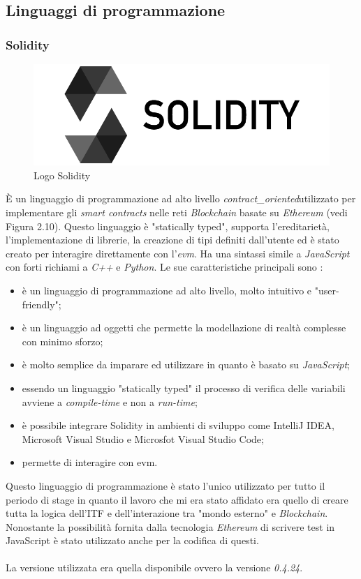 \subsection{Linguaggi di programmazione}
\subsubsection{Solidity}
\begin{figure}[h]
	\centering
	\includegraphics[scale=0.25]{immagini/solidity}
	\caption{Logo Solidity}
\end{figure}
È un linguaggio di programmazione ad alto livello \emph{\gls{contract_oriented}}\glsfirstoccur  utilizzato per implementare gli \textit{smart contracts} nelle reti \textit{Blockchain} basate su \textit{Ethereum} (vedi Figura 2.10).
Questo linguaggio è "statically typed", supporta l'ereditarietà, l'implementazione di librerie, la creazione di tipi definiti dall'utente ed è stato creato per interagire direttamente con l'\emph{\gls{evm}}\glsfirstoccur. 
Ha una sintassi simile a \textit{JavaScript} con forti richiami a \textit{C++} e \textit{Python}\cite{solidity}.
Le sue caratteristiche principali sono \cite{solidity}:
\begin{itemize}
	\item è un linguaggio di programmazione ad alto livello, molto intuitivo e "user-friendly";
	\item è un linguaggio ad oggetti che permette la modellazione di realtà complesse con minimo sforzo;
	\item è molto semplice da imparare ed utilizzare in quanto è basato su \textit{JavaScript};
	\item essendo un linguaggio "statically typed" il processo di verifica delle variabili avviene a \textit{compile-time} e non a \textit{run-time};
	\item è possibile integrare Solidity in ambienti di sviluppo come IntelliJ IDEA, Microsoft Visual Studio e Microsfot Visual Studio Code;
	\item permette di interagire con \gls{evm}.
\end{itemize}
Questo linguaggio di programmazione è stato l'unico utilizzato per tutto il periodo di stage in quanto il lavoro che mi era stato affidato era quello di creare tutta la logica dell'\gls{ITF} e dell'interazione tra "mondo esterno" e \textit{Blockchain}.\\
Nonostante la possibilità fornita dalla tecnologia \textit{Ethereum} di scrivere test in JavaScript è stato utilizzato anche per la codifica di questi.\\\\
La versione utilizzata era quella disponibile ovvero la versione \textit{0.4.24}.